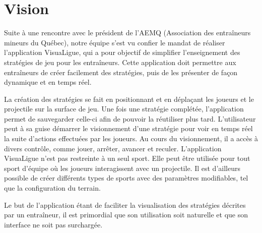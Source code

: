 
\chapter{Vision}
\label{s:vision}

Suite à une rencontre avec le président de l'AEMQ (Association des entraîneurs mineurs du Québec), notre équipe s'est vu confier le mandat de réaliser l'application VisuaLigue, qui a pour objectif de simplifier l'enseignement des stratégies de jeu pour les entraîneurs.
Cette application doit permettre aux entraîneurs de créer facilement des stratégies, puis de les présenter de façon dynamique et en temps réel.

La création des stratégies se fait en positionnant et en déplaçant les joueurs et le projectile sur la surface de jeu.
Une fois une stratégie complétée, l'application permet de sauvegarder celle-ci afin de pouvoir la réutiliser plus tard.
L'utilisateur peut à sa guise démarrer le visionnement d'une stratégie pour voir en temps réel la suite d'actions effectuées par les joueurs.
Au cours du visionnement, il a accès à divers contrôle, comme jouer, arrêter, avancer et reculer.
L'application VisuaLigue n'est pas restreinte à un seul sport.
Elle peut être utilisée pour tout sport d'équipe où les joueurs interagissent avec un projectile.
Il est d'ailleurs possible de créer différents types de sports avec des paramètres modifiables, tel que la configuration du terrain.

Le but de l'application étant de faciliter la visualisation des stratégies décrites par un entraîneur, il est primordial que son utilisation soit naturelle et que son interface ne soit pas surchargée.
